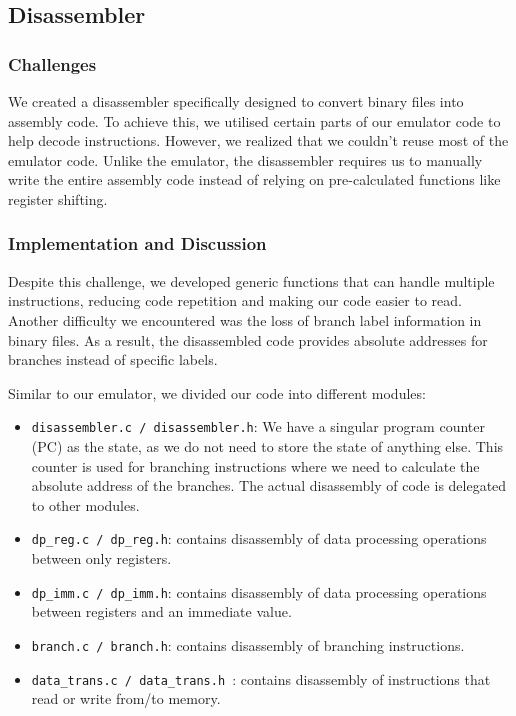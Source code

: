 \documentclass{article}
\begin{document}
\begin{adjustwidth}{2em}{0pt}
        \subsection{Disassembler}

            \subsubsection{Challenges}
            We created a disassembler specifically designed to convert binary files into assembly code. To achieve this, we utilised certain parts of our emulator code to help decode instructions. However, we realized that we couldn't reuse most of the emulator code. Unlike the emulator, the disassembler requires us to manually write the entire assembly code instead of relying on pre-calculated functions like register shifting.

            \newpage
            
            \subsubsection{Implementation and Discussion}
            Despite this challenge, we developed generic functions that can handle multiple instructions, reducing code repetition and making our code easier to read. Another difficulty we encountered was the loss of branch label information in binary files. As a result, the disassembled code provides absolute addresses for branches instead of specific labels. 
        
            Similar to our emulator, we divided our code into different modules: 
            \begin{itemize}
                \item \texttt{disassembler.c / disassembler.h}: 
               We have a singular program counter (PC) as the state, as we do not need to store the state of anything else. This counter is used for branching instructions where we need to calculate the absolute address of the branches. The actual disassembly of code is delegated to other modules.
                \item  \texttt{dp\_reg.c / dp\_reg.h}: contains disassembly of data processing operations between only registers.
                \item \texttt{dp\_imm.c / dp\_imm.h}: contains disassembly of data processing operations between registers and an immediate value.
                \item \texttt{branch.c / branch.h}: contains disassembly of branching instructions.
                \item \texttt{data\_trans.c / data\_trans.h }: contains disassembly of instructions that read or write from/to memory.
            \end{itemize}
        

\end{adjustwidth}
\end{document}
